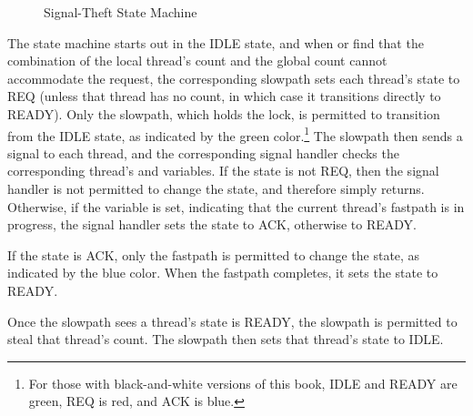 \begin{figure}
\centering
{}
\caption{Signal-Theft State Machine}
\label{fig:count:Signal-Theft State Machine}
\end{figure}

The state machine starts out in the IDLE state, and when 
or  find that the combination of the local thread's count
and the global count cannot accommodate the request, the corresponding
slowpath sets each thread's  state to REQ (unless that thread
has no count, in which case it transitions directly to READY)\@.
Only the slowpath, which holds the  lock, is permitted to
transition from the IDLE state, as indicated by the green color.\footnote{
	For those with black-and-white versions of this book,
	IDLE and READY are green, REQ is red, and ACK is blue.}
The slowpath then sends a signal to each thread, and the corresponding
signal handler checks the corresponding thread's  and
 variables.
If the  state is not REQ, then the signal handler is not
permitted to change the state, and therefore simply returns.
Otherwise, if the  variable is set, indicating that
the current thread's fastpath is in progress, the signal handler
sets the  state to ACK, otherwise to READY\@.

If the  state is ACK,
only the fastpath is permitted to change
the  state, as indicated by the blue color.
When the fastpath completes, it sets the  state to READY\@.

Once the slowpath sees a thread's  state is READY, the
slowpath is permitted to steal that thread's count.
The slowpath then sets that thread's  state to IDLE\@.

